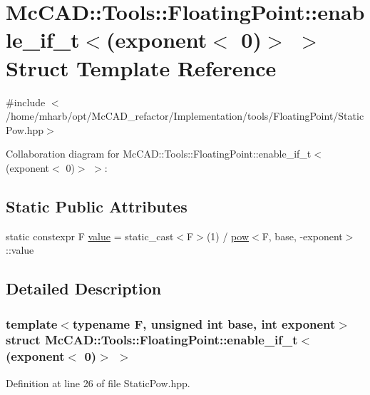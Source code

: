 \hypertarget{structMcCAD_1_1Tools_1_1FloatingPoint_1_1pow_3_01F_00_01base_00_01exponent_00_01typename_01std_1d82a2d6b1221060811eec8f3212877c0}{}\section{Mc\+C\+AD\+:\+:Tools\+:\+:Floating\+Point\+:\+:enable\+\_\+if\+\_\+t$<$(exponent$<$ 0)$>$ $>$ Struct Template Reference}
\label{structMcCAD_1_1Tools_1_1FloatingPoint_1_1pow_3_01F_00_01base_00_01exponent_00_01typename_01std_1d82a2d6b1221060811eec8f3212877c0}


{\ttfamily \#include $<$/home/mharb/opt/\+Mc\+C\+A\+D\+\_\+refactor/\+Implementation/tools/\+Floating\+Point/\+Static\+Pow.\+hpp$>$}



Collaboration diagram for Mc\+C\+AD\+:\+:Tools\+:\+:Floating\+Point\+:\+:enable\+\_\+if\+\_\+t$<$(exponent$<$ 0)$>$ $>$\+:
\subsection*{Static Public Attributes}
\begin{DoxyCompactItemize}
\item 
static constexpr F \hyperlink{structMcCAD_1_1Tools_1_1FloatingPoint_1_1pow_3_01F_00_01base_00_01exponent_00_01typename_01std_1d82a2d6b1221060811eec8f3212877c0_a4be6eaa079b41211c89f7a5cf4c6e03b}{value} = static\+\_\+cast$<$F$>$(1) / \hyperlink{structMcCAD_1_1Tools_1_1FloatingPoint_1_1pow}{pow}$<$F, base, -\/exponent$>$\+::value
\end{DoxyCompactItemize}


\subsection{Detailed Description}
\subsubsection*{template$<$typename F, unsigned int base, int exponent$>$\newline
struct Mc\+C\+A\+D\+::\+Tools\+::\+Floating\+Point\+::enable\+\_\+if\+\_\+t$<$(exponent$<$ 0)$>$ $>$}



Definition at line 26 of file Static\+Pow.\+hpp.




